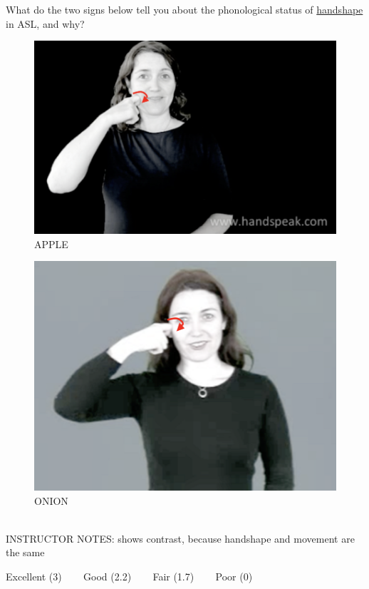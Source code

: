 \documentclass[12pt]{article}
\begin{document}
What do the two signs below tell you about the phonological status of \underline{handshape} in ASL, and why?\\

\begin{figure}[H]
\includegraphics{../images/asl_apple.png}
\caption{APPLE}
\end{figure}
\begin{figure}[H]
\includegraphics{../images/asl_onion.png}
\caption{ONION}
\end{figure}

~\\
INSTRUCTOR NOTES: shows contrast, because handshape and movement are the same


\vfill
Excellent (3) ~~~ Good (2.2) ~~~ Fair (1.7) ~~~ Poor (0)
\newpage

\begin{center}
\textbf{{\color{red}{\HUGE END OF EXAM}}}\\

\end{center}
\newpage
\end{document}
